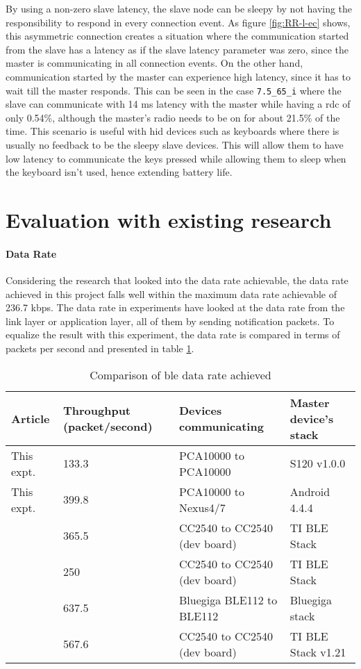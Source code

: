 By using a non-zero slave latency, the slave node can be sleepy by not having the responsibility to respond in every connection event. As figure \ref{fig:RR-l-ec} shows, this asymmetric connection creates a situation where the communication started from the slave has a latency as if the slave latency parameter was zero, since the master is communicating in all connection events. On the other hand, communication started by the master can experience high latency, since it has to wait till the master responds. This can be seen in the case \texttt{7.5\_65\_i} where the slave can communicate with 14 ms latency with the master while having a \gls{rdc} of only 0.54\%, although the master's radio needs to be on for about 21.5\% of the time. This scenario is useful with \gls{hid} devices such as keyboards where there is usually no feedback to be the sleepy slave devices. This will allow them to have low latency to communicate the keys pressed while allowing them to sleep when the keyboard isn't used, hence extending battery life.

\section{Evaluation with existing research}
\paragraph{Data Rate}
Considering the research that looked into the data rate achievable, the data rate achieved in this project falls well within the maximum data rate achievable\cite{Gomez2011} of 236.7 kbps. The data rate in experiments have looked at the data rate from the link layer\cite{Mikhaylov2013} or application layer\cite{Gomez2012}\cite{Mackensen2012}\cite{Kindt2014}, all of them by sending notification packets. To equalize the result with this experiment, the data rate is compared in terms of packets per second and presented in table \ref{tbl:dataRate}.

\begin{table}[h]
\centering
    \begin{tabular}[c]{|l|m{2.7cm}|l|l|}
    \hline
    Article    & Throughput (packet/second) & Devices communicating & Master device's stack \\ \hline
    This expt. & 133.3 & PCA10000 to PCA10000 & S120 v1.0.0    \\ \hline
    This expt. & 399.8 & PCA10000 to Nexus4/7 & Android 4.4.4  \\ \hline
    \cite{Gomez2012} & 365.5 & CC2540 to CC2540 (dev board) & TI BLE Stack \\ \hline
    \cite{Mackensen2012} & 250 & CC2540 to CC2540 (dev board) & TI BLE Stack \\ \hline
    \cite{Kindt2014} & 637.5 & Bluegiga BLE112 to BLE112 & Bluegiga stack \cite{MikkoSavolainen} \\ \hline
    \cite{Mikhaylov2013} & 567.6 & CC2540 to CC2540 (dev board) & TI BLE Stack v1.21 \\ \hline
    \end{tabular}
    \caption{Comparison of \gls{ble} data rate achieved}
    \label{tbl:dataRate}
\end{table}

